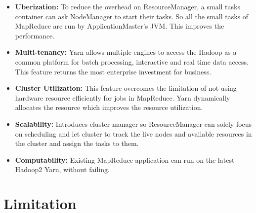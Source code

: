 \documentclass[9pt,twocolumn,twoside]{../../styles/osajnl}
\begin{document}
\begin{itemize}
	
	\item \textbf{Uberization:}  To reduce the overhead on ResourceManager, a small tasks container can ask NodeManager to start their tasks. So all the small tasks of MapReduce are run by ApplicationMaster’s JVM. This improves the performance.

	\item \textbf{Multi-tenancy:}  Yarn allows multiple engines to access the Hadoop as a common platform for batch processing, interactive and real time data access. This feature returns the most enterprise investment for business.
		
	\item \textbf{Cluster Utilization:}  This feature overcomes the limitation of not using hardware resource efficiently for jobs in MapReduce. Yarn dynamically allocates the resource which improves the resource utilization. 

	\item \textbf{Scalability:}  Introduces cluster manager so ResourceManager can solely focus on scheduling and let cluster to track the live nodes and available resources in the cluster and assign the tasks to them. 
	
	\item \textbf{Computability:} Existing MapReduce application can run on the latest Hadoop2 Yarn, without failing. 

\end{itemize}	
	
\section{Limitation}
\end{document}
